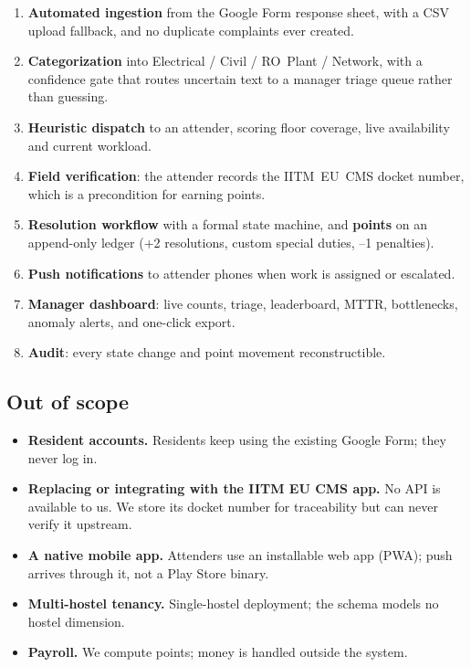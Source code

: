 \documentclass[10pt,a4paper]{article}
\begin{document}
\begin{enumerate}[label=\textbf{S\arabic*.}]
  \item \textbf{Automated ingestion} from the Google Form response sheet, with a CSV upload
        fallback, and no duplicate complaints ever created.
  \item \textbf{Categorization} into Electrical / Civil / RO~Plant / Network, with a confidence
        gate that routes uncertain text to a manager triage queue rather than guessing.
  \item \textbf{Heuristic dispatch} to an attender, scoring floor coverage, live availability and
        current workload.
  \item \textbf{Field verification}: the attender records the IITM~EU~CMS docket number, which is
        a precondition for earning points.
  \item \textbf{Resolution workflow} with a formal state machine, and \textbf{points} on an
        append-only ledger (+2 resolutions, custom special duties, --1 penalties).
  \item \textbf{Push notifications} to attender phones when work is assigned or escalated.
  \item \textbf{Manager dashboard}: live counts, triage, leaderboard, MTTR, bottlenecks, anomaly
        alerts, and one-click  export.
  \item \textbf{Audit}: every state change and point movement reconstructible.
\end{enumerate}

\subsection{Out of scope}

\begin{itemize}
  \item \textbf{Resident accounts.} Residents keep using the existing Google Form; they never log in.
  \item \textbf{Replacing or integrating with the IITM EU CMS app.} No API is available to us. We
        store its docket number for traceability but can never verify it upstream.
  \item \textbf{A native mobile app.} Attenders use an installable web app (PWA); push arrives
        through it, not a Play Store binary.
  \item \textbf{Multi-hostel tenancy.} Single-hostel deployment; the schema models no hostel dimension.
  \item \textbf{Payroll.} We compute points; money is handled outside the system.
\end{itemize}
\end{document}
